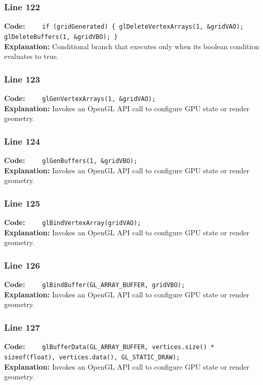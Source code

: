 \documentclass[11pt,a4paper]{article}
\begin{document}
\subsubsection*{Line 122}
\textbf{Code:} \verb|    if (gridGenerated) { glDeleteVertexArrays(1, &gridVAO); glDeleteBuffers(1, &gridVBO); }|\\
\textbf{Explanation:} Conditional branch that executes only when its boolean condition evaluates to true.

\subsubsection*{Line 123}
\textbf{Code:} \verb|    glGenVertexArrays(1, &gridVAO);|\\
\textbf{Explanation:} Invokes an OpenGL API call to configure GPU state or render geometry.

\subsubsection*{Line 124}
\textbf{Code:} \verb|    glGenBuffers(1, &gridVBO);|\\
\textbf{Explanation:} Invokes an OpenGL API call to configure GPU state or render geometry.

\subsubsection*{Line 125}
\textbf{Code:} \verb|    glBindVertexArray(gridVAO);|\\
\textbf{Explanation:} Invokes an OpenGL API call to configure GPU state or render geometry.

\subsubsection*{Line 126}
\textbf{Code:} \verb|    glBindBuffer(GL_ARRAY_BUFFER, gridVBO);|\\
\textbf{Explanation:} Invokes an OpenGL API call to configure GPU state or render geometry.

\subsubsection*{Line 127}
\textbf{Code:} \verb|    glBufferData(GL_ARRAY_BUFFER, vertices.size() * sizeof(float), vertices.data(), GL_STATIC_DRAW);|\\
\textbf{Explanation:} Invokes an OpenGL API call to configure GPU state or render geometry.
\end{document}
